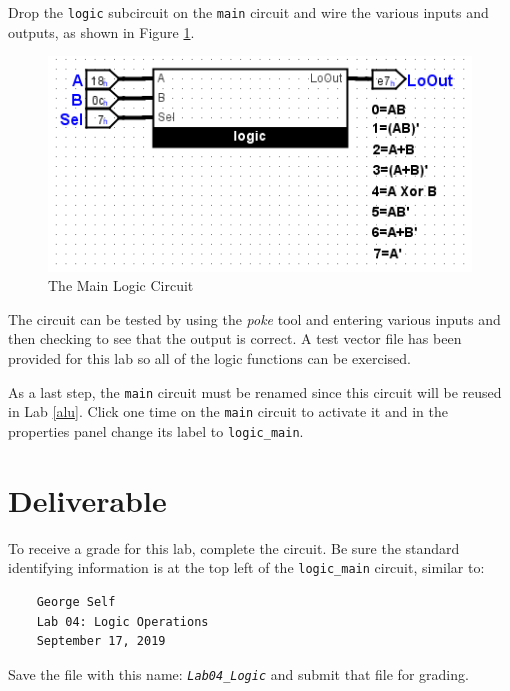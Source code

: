 Drop the \lstinline[columns=fixed]|logic| subcircuit on the  \lstinline[columns=fixed]|main| circuit and wire the various inputs and outputs, as shown in Figure \ref{fig:logic-01}. 

\begin{figure}[H]
	\centering
	\includegraphics[width=\maxwidth{.95\linewidth}]{gfx/logic-01}
	\caption{The Main Logic Circuit}
	\label{fig:logic-01}
\end{figure}

The circuit can be tested by using the \textit{poke} tool and entering various inputs and then checking to see that the output is correct. A test vector file has been provided for this lab so all of the logic functions can be exercised.

As a last step, the \lstinline[columns=fixed]|main| circuit must be renamed since this circuit will be reused in Lab \ref{alu}. Click one time on the \lstinline[columns=fixed]|main| circuit to activate it and in the properties panel change its label to \lstinline[columns=fixed]|logic_main|.


\section{Deliverable}

To receive a grade for this lab, complete the circuit. Be sure the standard identifying information is at the top left of the \lstinline[columns=fixed]|logic_main| circuit, similar to: 

\bigskip
\begin{minipage}{\linewidth}
	\begin{verbatim}
	George Self
	Lab 04: Logic Operations
	September 17, 2019
	\end{verbatim}
\end{minipage}
\bigskip

Save the file with this name: \emph{\texttt{Lab04\_Logic}} and submit that file for grading.

